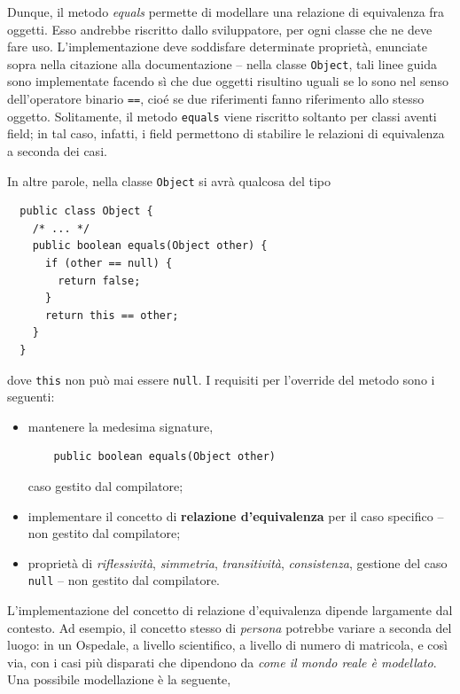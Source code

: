\documentclass[\fontsizeclass,twocolumn]{\classname}
\theoremstyle{definition}
\theoremstyle{definition}
\begin{document}
Dunque, il metodo \emph{equals} permette di modellare una relazione di
equivalenza fra oggetti. Esso andrebbe riscritto dallo sviluppatore, per ogni
classe che ne deve fare uso. L'implementazione deve soddisfare determinate
proprietà, enunciate sopra nella citazione alla documentazione \--- nella
classe \texttt{Object}, tali linee guida sono implementate facendo sì che due
oggetti risultino uguali se lo sono nel senso dell'operatore binario
\texttt{==}, cioé se due riferimenti fanno riferimento allo stesso oggetto.
Solitamente, il metodo \texttt{equals} viene riscritto soltanto per classi
aventi field; in tal caso, infatti, i field permettono di stabilire le
relazioni di equivalenza a seconda dei casi.

In altre parole, nella classe \texttt{Object} si avrà qualcosa del tipo

\begin{lstlisting}
  public class Object {
    /* ... */
    public boolean equals(Object other) {
      if (other == null) {
        return false;
      }
      return this == other;
    }
  }
\end{lstlisting}

dove \texttt{this} non può mai essere \texttt{null}. I requisiti per l'override
del metodo sono i seguenti:
\begin{itemize} 
  \item mantenere la medesima signature, 

  \begin{lstlisting}
    public boolean equals(Object other)
  \end{lstlisting} 

  caso gestito dal compilatore;

  \item implementare il concetto di \textbf{relazione d'equivalenza} per il caso
  specifico \--- non gestito dal compilatore;
  \item proprietà di \emph{riflessività}, \emph{simmetria}, \emph{transitività},
  \emph{consistenza}, gestione del caso \texttt{null} \--- non gestito dal
  compilatore.
\end{itemize}

L'implementazione del concetto di relazione d'equivalenza dipende largamente dal
contesto. Ad esempio, il concetto stesso di \emph{persona} potrebbe variare a
seconda del luogo: in un Ospedale, a livello scientifico, a livello di numero di
matricola, e così via, con i casi più disparati che dipendono da \emph{come il
mondo reale è modellato}. Una possibile modellazione è la seguente,
\end{document}
